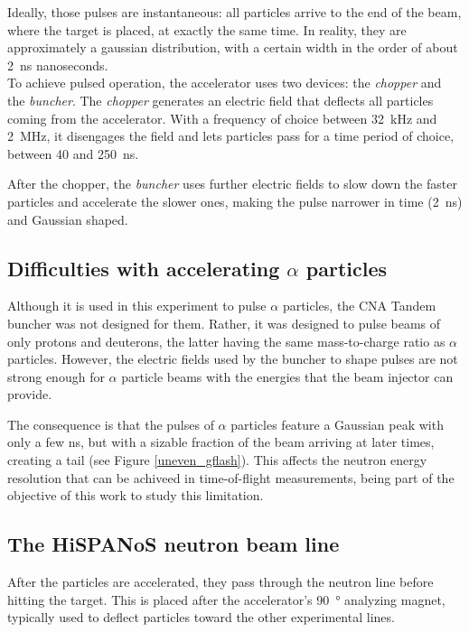 \documentclass[a4paper,12pt]{report}
\begin{document}
Ideally, those pulses are instantaneous: all particles arrive to the end of the beam, where the target is placed, at exactly the same time.
In reality, they are approximately a gaussian distribution, with a certain width in the order of about \qty{2}{\nano\second} nanoseconds.
\\

To achieve pulsed operation, the accelerator uses two devices: the \textit{chopper} and the \textit{buncher}.
The \textit{chopper} generates an electric field that deflects all particles coming from the accelerator.
With a frequency of choice between \qty{32}{\kilo\Hz} and \qty{2}{\mega\Hz}, it disengages the field and lets particles pass for a time period of choice, between 40 and \qty{250}{\nano\second}.

After the chopper, the \textit{buncher} uses further electric fields to slow down the faster particles and accelerate the slower ones, making the pulse narrower in time (\qty{2}{\nano\second}) and Gaussian shaped.\cite{hispanos}
\\

\subsection{Difficulties with accelerating $\alpha$ particles}
Although it is used in this experiment to pulse $\alpha$ particles, the CNA Tandem buncher was not designed for them.
Rather, it was designed to pulse beams of only protons and deuterons, the latter having the same mass-to-charge ratio as $\alpha$ particles.
However, the electric fields used by the buncher to shape pulses are not strong enough for $\alpha$ particle beams with the energies that the beam injector can provide.

The consequence is that the pulses of $\alpha$ particles feature a Gaussian peak with only a few \unit{\nano\second}, but with a sizable fraction of the beam arriving at later times, creating a tail (see Figure \ref{uneven_gflash}).
This affects the neutron energy resolution that can be achiveed in time-of-flight measurements, being part of the objective of this work to study this limitation.
\\

\subsection{The HiSPANoS neutron beam line}
After the particles are accelerated, they pass through the neutron line before hitting the target.
This is placed after the accelerator's \qty{90}{\degree} analyzing magnet, typically used to deflect particles toward the other experimental lines.
\end{document}
